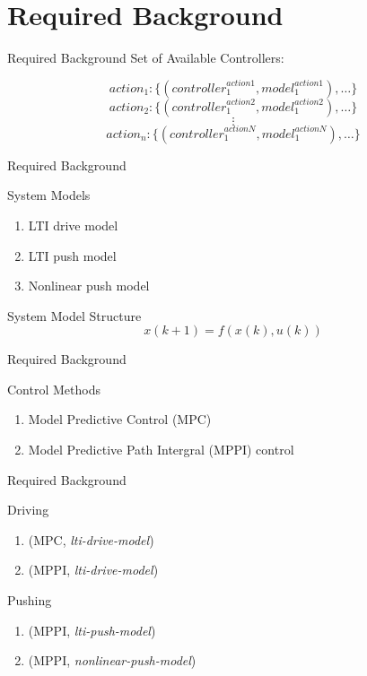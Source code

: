 \section{Required Background}
\begin{frame}[fragile]{Required Background} 
Set of Available Controllers:

\[action_1: \{ (\mathit{controller}_1^\mathit{action1}, \mathit{model}_1^\mathit{action1}), \dots \}\]
\[action_2: \{ (\mathit{controller}_1^\mathit{action2}, \mathit{model}_1^\mathit{action2}), \dots \}\]
\[\vdots\]
\[action_n:  \{ (\mathit{controller}_1^\mathit{actionN}, \mathit{model}_1^\mathit{actionN}), \dots \}\]
\end{frame}


\begin{frame}[fragile]{Required Background} 
\begin{block}{System Models}
\begin{enumerate}
  \item LTI drive model\pause
  \item LTI push model\pause
  \item Nonlinear push model
\end{enumerate}
\end{block}\pause

System Model Structure
  \[x(k+1) = f(x(k), u(k))\]
\end{frame}

\begin{frame}[fragile]{Required Background} 
\begin{block}{Control Methods}
\begin{enumerate}
  \item Model Predictive Control (MPC)
  \item Model Predictive Path Intergral (MPPI) control
\end{enumerate}
\end{block}
\end{frame}


\begin{frame}[fragile]{Required Background} 
\begin{block}{Driving}
\begin{enumerate}
  \item (MPC, \textit{lti-drive-model})
  \item (MPPI, \textit{lti-drive-model})
\end{enumerate}
\end{block}

\begin{block}{Pushing}
\begin{enumerate}
  \item (MPPI, \textit{lti-push-model})
  \item (MPPI, \textit{nonlinear-push-model})
\end{enumerate}
\end{block}
\end{frame}

